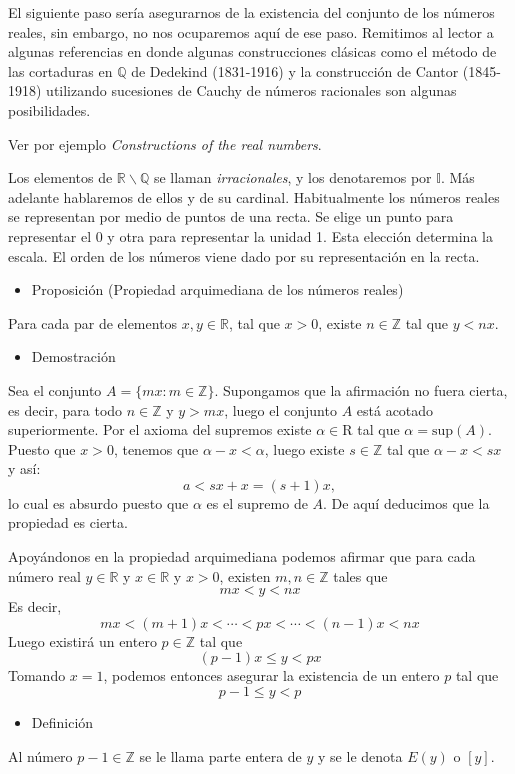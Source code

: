 \documentclass[12pt]{article}
\begin{document}
El siguiente paso sería asegurarnos de la existencia del conjunto de los números reales, sin embargo, no nos ocuparemos aquí de ese paso. Remitimos al lector a algunas referencias en donde algunas construcciones clásicas como el método de las cortaduras en $\mathbb{Q}$ de Dedekind (1831-1916) y la construcción de Cantor (1845-1918) utilizando sucesiones de Cauchy de números racionales son algunas posibilidades. 

Ver por ejemplo \textit{Constructions of the real numbers}. 

Los elementos de $\mathbb{R}\backslash\mathbb{Q}$ se llaman \textit{irracionales}, y los denotaremos por $\mathbb{I}$. Más adelante hablaremos de ellos y de su cardinal. Habitualmente los números reales se representan por medio de puntos de una recta. Se elige un punto para representar el 0 y otra para representar la unidad 1. Esta elección determina la escala. El orden de los números viene dado por su representación en la recta.
\begin{itemize}[label=\color{red}\textbullet, leftmargin=*]
	\item \color{lightblue} Proposición (Propiedad arquimediana de los números reales)
\end{itemize}
Para cada par de elementos $x,y\in\mathbb{R}$, tal que $x>0$, existe $n\in\mathbb{Z}$ tal que $y<nx$.
\begin{itemize}[label=\color{red}\textbullet, leftmargin=*]
	\item \color{lightblue} Demostración
\end{itemize}
Sea el conjunto $A=\{mx:m\in\mathbb{Z}\}$. Supongamos que la afirmación no fuera cierta, es decir, para todo $n\in\mathbb{Z}$ y $y>mx$, luego el conjunto $A$ está acotado superiormente. Por el axioma del supremos existe $\alpha\in\mathrm{R}$ tal que $\alpha=\mathrm{sup}(A)$. Puesto que $x>0$, tenemos que $\alpha-x<\alpha$, luego existe $s\in\mathbb{Z}$ tal que $\alpha-x<sx$ y así: \[ a<sx+x=(s+1)x, \]lo cual es absurdo puesto que $\alpha$ es el supremo de $A$. De aquí deducimos que la propiedad es cierta. 

Apoyándonos en la propiedad arquimediana podemos afirmar que para cada número real $y\in\mathbb{R}$ y $x\in\mathbb{R}$ y $x>0$, existen $m,n\in\mathbb{Z}$ tales que \[ mx<y<nx \]
Es decir, \[ mx<(m+1)x<\cdots<px<\cdots<(n-1)x<nx \]
Luego existirá un entero $p\in\mathbb{Z}$ tal que \[ (p-1)x\le y<px \]
Tomando $x=1$, podemos entonces asegurar la existencia de un entero $p$ tal que \[ p-1\le y<p \]
\begin{itemize}[label=\color{red}\textbullet, leftmargin=*]
	\item \color{lightblue} Definición
\end{itemize}
Al número $p-1\in\mathbb{Z}$ se le llama parte entera de $y$ y se le denota $E(y)$ o $[y]$.
\end{document}
